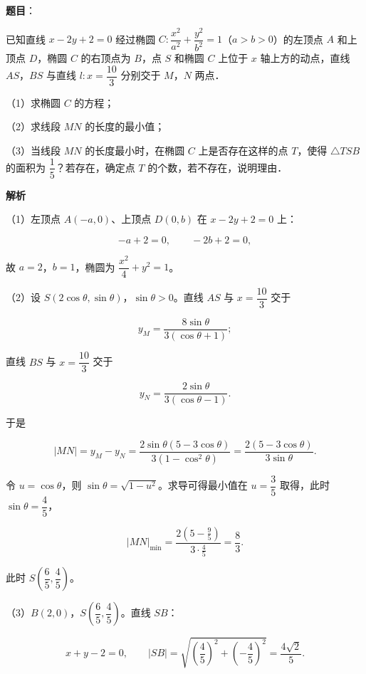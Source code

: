 \begin{answer}

\textbf{题目}：

已知直线 $x-2y+2=0$ 经过椭圆 $C:\dfrac{x^2}{a^2}+\dfrac{y^2}{b^2}=1$（$a>b>0$）的左顶点 $A$ 和上顶点 $D$，椭圆 $C$ 的右顶点为 $B$，点 $S$ 和椭圆 $C$ 上位于 $x$ 轴上方的动点，直线 $AS$，$BS$ 与直线 $l:x=\dfrac{10}3$ 分别交于 $M$，$N$ 两点．

（1）求椭圆 $C$ 的方程；

（2）求线段 $MN$ 的长度的最小值；

（3）当线段 $MN$ 的长度最小时，在椭圆 $C$ 上是否存在这样的点 $T$，使得 $\triangle TSB$ 的面积为 $\dfrac15$？若存在，确定点 $T$ 的个数，若不存在，说明理由．
\nopagebreak[4]
\begin{center}\end{center}
\nopagebreak[4]
\textbf{解析}

（1）左顶点 $A(-a,0)$、上顶点 $D(0,b)$ 在 $x-2y+2=0$ 上：

\nopagebreak[4]
\[-a+2=0,\qquad -2b+2=0,\]

故 $a=2$，$b=1$，椭圆为 $\dfrac{x^2}4+y^2=1$。

（2）设 $S(2\cos\theta,\sin\theta)$，$\sin\theta>0$。直线 $AS$ 与 $x=\dfrac{10}3$ 交于

\nopagebreak[4]
\[y_M=\frac{8\sin\theta}{3(\cos\theta+1)};\]

直线 $BS$ 与 $x=\dfrac{10}3$ 交于

\nopagebreak[4]
\[y_N=\frac{2\sin\theta}{3(\cos\theta-1)}.\]

于是

\nopagebreak[4]
\[|MN|=y_M-y_N
=\frac{2\sin\theta(5-3\cos\theta)}{3(1-\cos^2\theta)}
=\frac{2(5-3\cos\theta)}{3\sin\theta}.\]

令 $u=\cos\theta$，则 $\sin\theta=\sqrt{1-u^2}$。求导可得最小值在 $u=\dfrac35$ 取得，此时 $\sin\theta=\dfrac45$，

\nopagebreak[4]
\[|MN|_{\min}=\frac{2\left(5-\frac95\right)}{3\cdot\frac45}=\frac83.\]

此时 $S\left(\dfrac65,\dfrac45\right)$。

（3）$B(2,0)$，$S\left(\dfrac65,\dfrac45\right)$。直线 $SB$：

\nopagebreak[4]
\[x+y-2=0,\qquad |SB|=\sqrt{\left(\frac45\right)^2+\left(-\frac45\right)^2}=\frac{4\sqrt2}5.\]


\end{answer}
